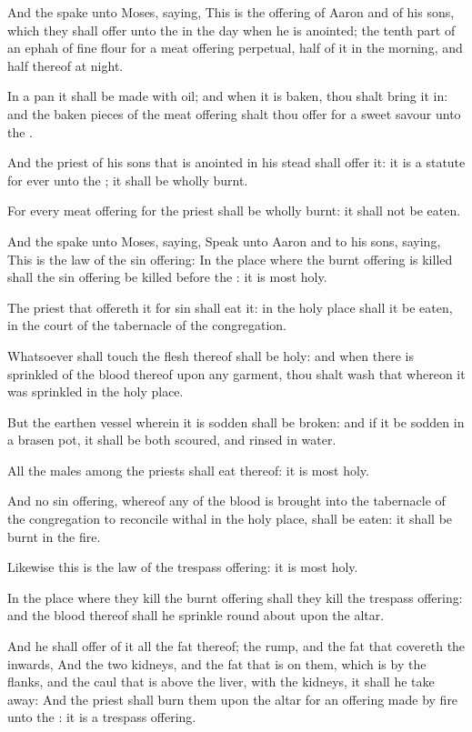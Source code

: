 \Verse And the \LORD spake unto Moses, saying, \Verse This is the offering of Aaron and of his sons, which they shall offer unto the \LORD in the day when he is anointed; the tenth part of an ephah of fine flour for a meat offering perpetual, half of it in the morning, and half thereof at night.

\Verse In a pan it shall be made with oil; and when it is baken, thou shalt bring it in: and the baken pieces of the meat offering shalt thou offer for a sweet savour unto the \LORD.

\Verse And the priest of his sons that is anointed in his stead shall offer it: it is a statute for ever unto the \LORD; it shall be wholly burnt.

\Verse For every meat offering for the priest shall be wholly burnt: it shall not be eaten.

\Verse And the \LORD spake unto Moses, saying, \Verse Speak unto Aaron and to his sons, saying, This is the law of the sin offering: In the place where the burnt offering is killed shall the sin offering be killed before the \LORD: it is most holy.

\Verse The priest that offereth it for sin shall eat it: in the holy place shall it be eaten, in the court of the tabernacle of the congregation.

\Verse Whatsoever shall touch the flesh thereof shall be holy: and when there is sprinkled of the blood thereof upon any garment, thou shalt wash that whereon it was sprinkled in the holy place.

\Verse But the earthen vessel wherein it is sodden shall be broken: and if it be sodden in a brasen pot, it shall be both scoured, and rinsed in water.

\Verse All the males among the priests shall eat thereof: it is most holy.

\Verse And no sin offering, whereof any of the blood is brought into the tabernacle of the congregation to reconcile withal in the holy place, shall be eaten: it shall be burnt in the fire.

\Chapter
\Verse Likewise this is the law of the trespass offering: it is most holy.

\Verse In the place where they kill the burnt offering shall they kill the trespass offering: and the blood thereof shall he sprinkle round about upon the altar.

\Verse And he shall offer of it all the fat thereof; the rump, and the fat that covereth the inwards, \Verse And the two kidneys, and the fat that is on them, which is by the flanks, and the caul that is above the liver, with the kidneys, it shall he take away: \Verse And the priest shall burn them upon the altar for an offering made by fire unto the \LORD: it is a trespass offering.

